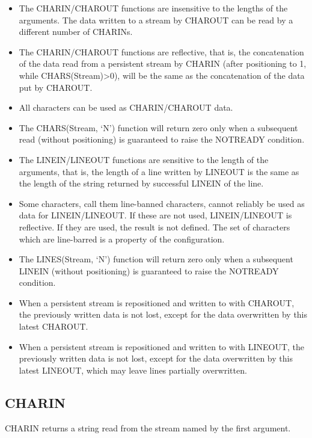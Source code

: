 \begin{itemize}
\item
  The CHARIN/CHAROUT functions are insensitive to the lengths of the
  arguments. The data written to a stream by CHAROUT can be read by a
  different number of CHARINs.
\item
  The CHARIN/CHAROUT functions are reflective, that is, the
  concatenation of the data read from a persistent stream by CHARIN
  (after positioning to 1, while CHARS(Stream)\textgreater0), will be
  the same as the concatenation of the data put by CHAROUT.
\item
  All characters can be used as CHARIN/CHAROUT data.
\item
  The CHARS(Stream, `N') function will return zero only when a
  subsequent read (without positioning) is guaranteed to raise the
  NOTREADY condition.
\item
  The LINEIN/LINEOUT functions are sensitive to the length of the
  arguments, that is, the length of a line written by LINEOUT is the
  same as the length of the string returned by successful LINEIN of the
  line.
\item
  Some characters, call them line-banned characters, cannot reliably be
  used as data for LINEIN/LINEOUT. If these are not used, LINEIN/LINEOUT
  is reflective. If they are used, the result is not defined. The set of
  characters which are line-barred is a property of the configuration.
\item
  The LINES(Stream, `N') function will return zero only when a
  subsequent LINEIN (without positioning) is guaranteed to raise the
  NOTREADY condition.
\item
  When a persistent stream is repositioned and written to with CHAROUT,
  the previously written data is not lost, except for the data
  overwritten by this latest CHAROUT.
\item
  When a persistent stream is repositioned and written to with LINEOUT,
  the previously written data is not lost, except for the data
  overwritten by this latest LINEOUT, which may leave lines partially
  overwritten.
\end{itemize}

\subsection{CHARIN}\label{charin}

CHARIN returns a string read from the stream named by the first
argument.



